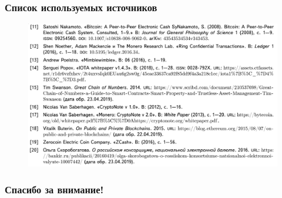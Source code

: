 \documentclass{beamer}
\begin{document}
\begin{frame}
    \frametitle{Список используемых источников}
    \begin{figure}
        \includegraphics[width=\columnwidth]{lit2.png}
    \end{figure}
\end{frame}

\begin{frame}[c]
\begin{center}
\frametitle{\LARGE Спасибо за внимание!}

{\LARGE \inserttitle}

\bigskip

{\insertauthor}

\bigskip\bigskip

{\insertinstitute}

\bigskip\bigskip

{\large \insertdate}
\end{center}
\end{frame}
\end{document}
